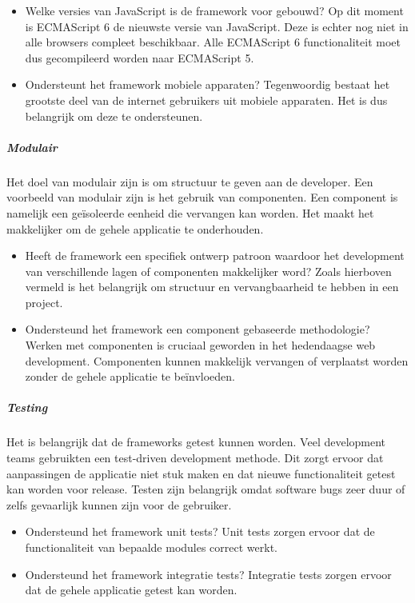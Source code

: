\begin{itemize}
	\item Welke versies van JavaScript is de framework voor gebouwd? Op dit moment is ECMAScript 6 de nieuwste versie van JavaScript. Deze is echter nog niet in alle browsers compleet beschikbaar. Alle ECMAScript 6 functionaliteit moet dus gecompileerd worden naar ECMAScript 5.
	\item Ondersteunt het framework mobiele apparaten? Tegenwoordig bestaat het grootste deel van de internet gebruikers uit mobiele apparaten. Het is dus belangrijk om deze te ondersteunen.
\end{itemize}

\subparagraph{Modulair}
Het doel van modulair zijn is om structuur te geven aan de developer. Een voorbeeld van modulair zijn is het gebruik van componenten. Een component is namelijk een geïsoleerde eenheid die vervangen kan worden. Het maakt het makkelijker om de gehele applicatie te onderhouden.

\begin{itemize}
	\item Heeft de framework een specifiek ontwerp patroon waardoor het development van verschillende lagen of componenten makkelijker word? Zoals hierboven vermeld is het belangrijk om structuur en vervangbaarheid te hebben in een project. 
	\item Ondersteund het framework een component gebaseerde methodologie? Werken met componenten is cruciaal geworden in het hedendaagse web development. Componenten kunnen makkelijk vervangen of verplaatst worden zonder de gehele applicatie te beïnvloeden.
\end{itemize}

\subparagraph{Testing}
Het is belangrijk dat de frameworks getest kunnen worden. Veel development teams gebruikten een test-driven development methode. Dit zorgt ervoor dat aanpassingen de applicatie niet stuk maken en dat nieuwe functionaliteit getest kan worden voor release. Testen zijn belangrijk omdat software bugs zeer duur of zelfs gevaarlijk kunnen zijn voor de gebruiker.

\begin{itemize}
	\item Ondersteund het framework unit tests? Unit tests zorgen ervoor dat de functionaliteit van bepaalde modules correct werkt.
	\item Ondersteund het framework integratie tests? Integratie tests zorgen ervoor dat de gehele applicatie getest kan worden.
\end{itemize}

